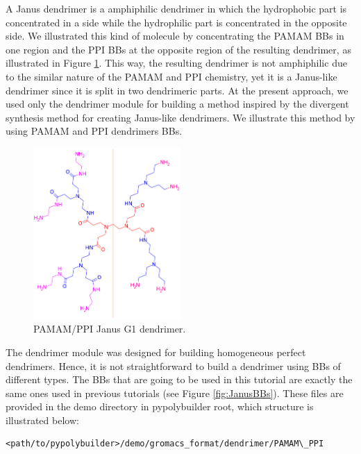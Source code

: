 
A Janus dendrimer is a amphiphilic dendrimer in which the hydrophobic part is concentrated in a side while the hydrophilic part is concentrated in the opposite side.
We illustrated this kind of molecule by concentrating the PAMAM BBs in one region and the PPI BBs at the opposite region of the resulting dendrimer, as illustrated in Figure \ref{fig:JanusG1}.
This way, the resulting dendrimer is not amphiphilic due to the similar nature of the PAMAM and PPI chemistry, yet it is a Janus-like dendrimer since it is split in two dendrimeric parts.
At the present approach, we used only the dendrimer module for building a method inspired by the divergent synthesis method for creating Janus-like dendrimers.
We illustrate this method by using PAMAM and PPI dendrimers BBs.

\begin{figure}
    \centering
    \includegraphics[width=0.5\textwidth]{PAMAM_PPI-Janus/JANUSG1.png}
    \caption{PAMAM/PPI Janus G1 dendrimer.}
    \label{fig:JanusG1}
\end{figure}

The dendrimer module was designed for building homogeneous perfect dendrimers.
Hence, it is not straightforward to build a dendrimer using BBs of different types.
The BBs that are going to be used in this tutorial are exactly the same ones used in previous tutorials (see Figure \ref{fig:JanusBBs}).
These files are provided in the demo directory in pypolybuilder root, which structure is illustrated below:
\begin{lstlisting}
<path/to/pypolybuilder>/demo/gromacs_format/dendrimer/PAMAM\_PPI
\end{lstlisting}

